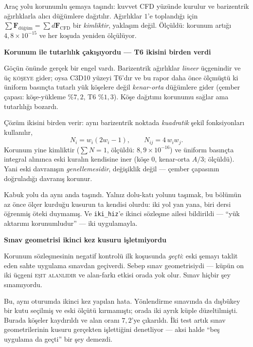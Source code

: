 \documentclass[11pt,a4paper]{article}
\newcommand{\kkkenar}{lacivert}
\newcommand{\kkzemin}{kod}
\newenvironment{renkkutu}[3]{%
  \renewcommand{\kkkenar}{#1}\renewcommand{\kkzemin}{#2}%
  \par\medskip\noindent
  \begin{lrbox}{\kutugovde}%
  \begin{minipage}{\dimexpr\linewidth-2\fboxsep-2\fboxrule\relax}\footnotesize
  \textcolor{#1}{\textbf{#3}}\par\vspace{3pt}%
}{%
  \end{minipage}%
  \end{lrbox}%
  \noindent\fcolorbox{\kkkenar}{\kkzemin}{\usebox{\kutugovde}}%
  \par\medskip
}
\newenvironment{dikkat}[1]{\begin{renkkutu}{orta}{ortabg}{#1}}{\end{renkkutu}}
\begin{document}
\noindent Araç yolu korunumlu şemaya taşındı: kuvvet CFD yüzünde kurulur
ve barizentrik ağırlıklarla alıcı düğümlere dağıtılır. Ağırlıklar $1$'e
toplandığı için $\sum \mathbf{F}_{\text{düğüm}} = \sum d\mathbf{F}_{
\text{CFD}}$ bir \emph{kimliktir}, yaklaşım değil. Ölçüldü: korunum artığı
$4{,}8\times10^{-15}$ ve her koşuda yeniden ölçülüyor.

\begin{dikkat}{Korunum ile tutarlılık çakışıyordu --- T6 ikisini birden
verdi}
Göçün önünde gerçek bir engel vardı. Barizentrik ağırlıklar \emph{lineer}
üçgenindir ve üç \textsc{köşeye} gider; oysa C3D10 yüzeyi T6'dır ve bu
rapor daha önce ölçmüştü ki üniform basınçta tutarlı yük köşelere değil
\emph{kenar-orta} düğümlere gider (çember çapası: köşe-yükleme \%$7{,}2$,
T6 \%$1{,}3$). Köşe dağıtımı korunumu sağlar ama tutarlılığı bozardı.

\noindent Çözüm ikisini birden verir: aynı barizentrik noktada
\emph{kuadratik} şekil fonksiyonları kullanılır,
\[
  N_i = w_i(2w_i-1), \qquad N_{ij} = 4\,w_i w_j .
\]
Korunum yine kimliktir ($\sum N = 1$, ölçüldü: $8{,}9\times10^{-16}$) ve
üniform basınçta integral alınınca eski kuralın kendisine iner (köşe $0$,
kenar-orta $A/3$; ölçüldü). Yani eski davranışın \emph{genellemesidir},
değişiklik değil --- çember çapasının doğruladığı davranış korunur.
\end{dikkat}

\noindent Kabuk yolu da aynı anda taşındı. Yalnız dolu-katı yolunu taşımak,
bu bölümün az önce ölçer kurduğu kusurun ta kendisi olurdu: iki yol yan
yana, biri dersi öğrenmiş öteki duymamış. Ve \texttt{iki\_hiz}'e ikinci
sözleşme ailesi bildirildi --- ``yük aktarımı korunumludur'' --- iki
uygulamayla.

\begin{dikkat}{Sınav geometrisi ikinci kez kusuru işletmiyordu}
Korunum sözleşmesinin negatif kontrolü ilk koşusunda \emph{geçti}: eski
şemayı taklit eden sahte uygulama sınavdan geçiverdi. Sebep sınav
geometrisiydi --- küpün on iki üçgeni \textsc{eşit alanlıdır} ve
alan-farkı etkisi orada yok olur. Sınav hiçbir şey sınamıyordu.

\noindent Bu, aynı oturumda ikinci kez yapılan hata. Yönlendirme sınavında
da dışbükey bir kutu seçilmiş ve eski ölçütü kırmamıştı; orada iki ayrık
küple düzeltilmişti. Burada köşeler kaydırıldı ve alan oranı $7{,}2$'ye
çıkarıldı. İki test artık sınav geometrilerinin kusuru gerçekten
işlettiğini denetliyor --- aksi halde ``beş uygulama da geçti'' bir şey
demezdi.
\end{dikkat}
\end{document}
